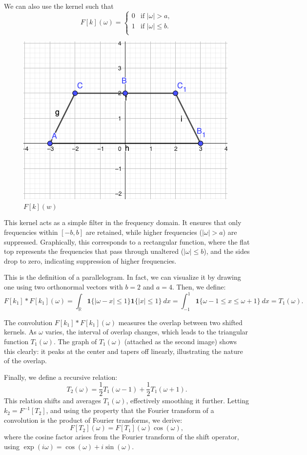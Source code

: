 \documentclass{article}
\begin{document}
\begin{remark}
    We can also use the kernel such that
    \[
    F[k](\omega) = \begin{cases} 
    0 & \text{if } |\omega| > a, \\ 
    1 & \text{if } |\omega| \leq b. \\
    \end{cases}
    \]


    \begin{figure}[h]
        \centering
        \includegraphics[width=0.4 \textwidth]{kernel_1_example.png} %
        \caption{$F[k](w)$}
        \label{fig:tradeoff}
    \end{figure}
    
    This kernel acts as a simple filter in the frequency domain. It ensures that only frequencies within \([-b, b]\) are retained, while higher frequencies (\(|\omega| > a\)) are suppressed. Graphically, this corresponds to a rectangular function, where the flat top represents the frequencies that pass through unaltered (\(|\omega| \leq b\)), and the sides drop to zero, indicating suppression of higher frequencies.

    This is the definition of a parallelogram. In fact, we can visualize it by drawing one using two orthonormal vectors with \(b=2\) and \(a=4\). Then, we define:
    \[
        F[k_1] * F[k_1](\omega) = \int_{\mathbb{R}} \mathbf{1}\{ |\omega - x| \leq 1 \} \mathbf{1}\{ |x| \leq 1 \} \ dx = \int_{-1}^{1} \mathbf{1}\{ \omega - 1 \leq x \leq \omega + 1 \} \ dx = T_{1}(\omega).
    \]

    The convolution \(F[k_1] * F[k_1](\omega)\) measures the overlap between two shifted kernels. As \(\omega\) varies, the interval of overlap changes, which leads to the triangular function \(T_1(\omega)\). The graph of \(T_1(\omega)\) (attached as the second image) shows this clearly: it peaks at the center and tapers off linearly, illustrating the nature of the overlap.

    Finally, we define a recursive relation:
    \[
    T_{2}(\omega) = \frac{1}{2}T_{1}(\omega-1) + \frac{1}{2}T_{1}(\omega+1).
    \]
    This relation shifts and averages \(T_1(\omega)\), effectively smoothing it further. Letting \(k_2 = F^{-1}[T_2]\), and using the property that the Fourier transform of a convolution is the product of Fourier transforms, we derive:
    \[
    F[T_2](\omega) = F[T_1](\omega)\cos(\omega),
    \]
    where the cosine factor arises from the Fourier transform of the shift operator, using \(\exp(i\omega) = \cos(\omega) + i\sin(\omega)\).


\end{remark}
\end{document}
